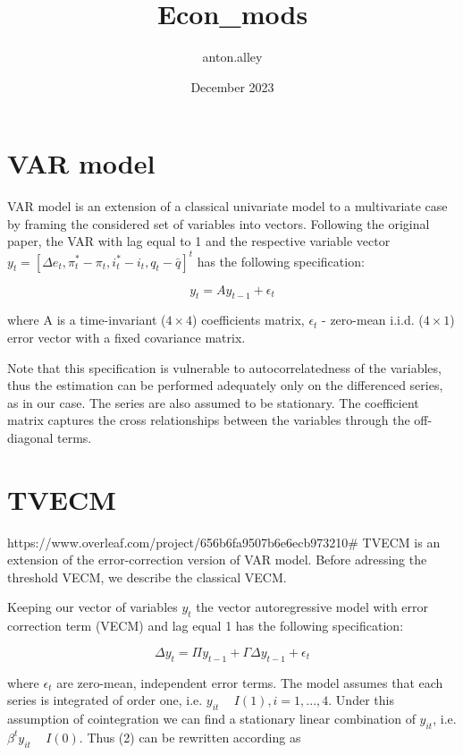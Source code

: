 \documentclass{article}
\title{Econ_mods}
\author{anton.alley }
\date{December 2023}
\begin{document}
\maketitle

\section{VAR model}

VAR model is an extension of a classical univariate model to a multivariate case by framing the considered set of variables into vectors. Following the original paper, the VAR with lag equal to 1 and the respective variable vector $y_t = [\Delta e_t, \pi^{*}_t - \pi_t, i^{*}_t - i_t, q_t - \bar{q}]^t$ has the following specification:

\begin{equation}
    y_t = Ay_{t-1} + \epsilon_t
\end{equation}

where A is a time-invariant ($4 \times 4$) coefficients matrix, $\epsilon_t$ - zero-mean i.i.d. ($4 \times 1$) error vector with a fixed covariance matrix. 

Note that this specification is vulnerable to autocorrelatedness of the variables, thus the estimation can be performed adequately only on the differenced series, as in our case. The series are also assumed to be stationary. The coefficient matrix captures the cross relationships between the variables through the off-diagonal terms.

\section{TVECM}
https://www.overleaf.com/project/656b6fa9507b6e6ecb973210#
TVECM is an extension of the error-correction version of VAR model. Before adressing the threshold VECM, we describe the classical VECM. 

Keeping our vector of variables $y_t$ the vector autoregressive model with error correction term (VECM) and lag equal 1 has the following specification:

\begin{equation}
\Delta y_t = \Pi y_{t-1} + \Gamma\Delta y_{t-1} + \epsilon_t 
\end{equation}

where $\epsilon_t$ are zero-mean, independent error terms. The model assumes that each series is integrated of order one, i.e. $y_{it}$ ~ $I(1), i = 1, ... , 4$. Under this assumption of cointegration we can find a stationary linear combination of  $y_{it}$, i.e. $\beta^t y_{it}$ ~ $I(0)$. Thus (2) can be rewritten according as 
\end{document}
